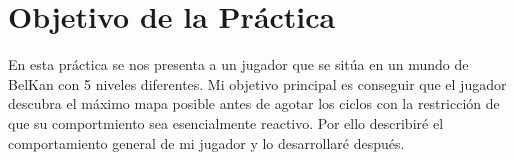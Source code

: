 \documentclass[12pt, spanish]{article}
\begin{document}
\newpage



\tableofcontents
\pagebreak


\section{Objetivo de la Práctica}
En esta práctica se nos presenta a un jugador que se sitúa en un mundo de BelKan con 5 niveles diferentes. Mi objetivo principal es conseguir que el jugador descubra el máximo mapa posible antes de agotar los ciclos con la restricción de que su comportmiento sea esencialmente reactivo. Por ello describiré el comportamiento general de mi jugador y lo desarrollaré después.
\end{document}
